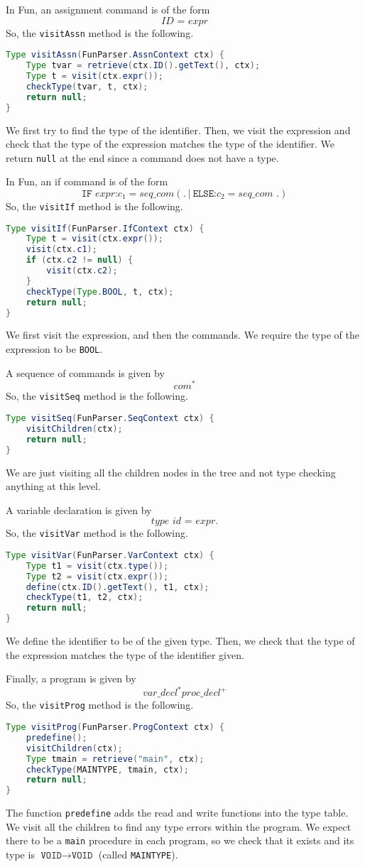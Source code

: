 \documentclass[a4paper, openany]{memoir}
\begin{document}
In Fun, an assignment command is of the form
\[\textit{ID} \texttt{ = } \textit{expr}\]
So, the \texttt{visitAssn} method is the following.
\begin{lstlisting}[language=java]
Type visitAssn(FunParser.AssnContext ctx) {
    Type tvar = retrieve(ctx.ID().getText(), ctx);
    Type t = visit(ctx.expr());
    checkType(tvar, t, ctx);
    return null;
}
\end{lstlisting}
We first try to find the type of the identifier. Then, we visit the expression and check that the type of the expression matches the type of the identifier. We return \texttt{null} at the end since a command does not have a type.

In Fun, an if command is of the form
\[\texttt{IF } \textit{expr} \texttt{:} \textit{c}_1 = \textit{seq\_com} (\texttt{.} \ | \ \texttt{ELSE:} \textit{c}_2 = \textit{seq\_com } \texttt{.})\]
So, the \texttt{visitIf} method is the following.
\begin{lstlisting}[language=java]
Type visitIf(FunParser.IfContext ctx) {
    Type t = visit(ctx.expr());
    visit(ctx.c1);
    if (ctx.c2 != null) {
        visit(ctx.c2);
    }
    checkType(Type.BOOL, t, ctx);
    return null;
}
\end{lstlisting}
We first visit the expression, and then the commands. We require the type of the expression to be \texttt{BOOL}.

A sequence of commands is given by
\[\textit{com}^*\]
So, the \texttt{visitSeq} method is the following.
\begin{lstlisting}[language=java]
Type visitSeq(FunParser.SeqContext ctx) {
    visitChildren(ctx);
    return null;
}
\end{lstlisting}
We are just visiting all the children nodes in the tree and not type checking anything at this level.

A variable declaration is given by
\[\textit{type id} \texttt{ = } \textit{expr}.\]
So, the \texttt{visitVar} method is the following.
\begin{lstlisting}[language=java]
Type visitVar(FunParser.VarContext ctx) {
    Type t1 = visit(ctx.type());
    Type t2 = visit(ctx.expr());
    define(ctx.ID().getText(), t1, ctx);
    checkType(t1, t2, ctx);
    return null;
}
\end{lstlisting}
We define the identifier to be of the given type. Then, we check that the type of the expression matches the type of the identifier given.

Finally, a program is given by
\[\textit{var\_decl}^* \textit{proc\_decl}^+ \]
So, the \texttt{visitProg} method is the following.
\begin{lstlisting}[language=java]
Type visitProg(FunParser.ProgContext ctx) {
    predefine();
    visitChildren(ctx);
    Type tmain = retrieve("main", ctx);
    checkType(MAINTYPE, tmain, ctx);
    return null;
}
\end{lstlisting}
The function \texttt{predefine} adds the read and write functions into the type table. We visit all the children to find any type errors within the program. We expect there to be a \texttt{main} procedure in each program, so we check that it exists and its type is $\texttt{VOID} \to \texttt{VOID}$ (called \texttt{MAINTYPE}).
\end{document}
